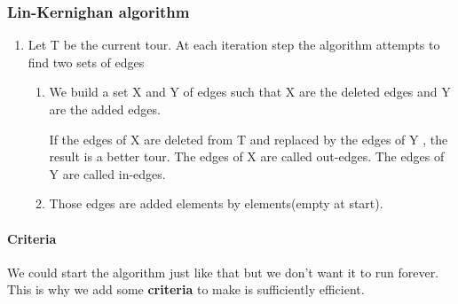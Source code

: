 \subsubsection{Lin-Kernighan algorithm}
\begin{enumerate}
    \item Let T be the current tour. At each iteration step the
        algorithm attempts to find two sets of edges

        \begin{enumerate}
            \item  We build a set X and Y of edges such that X are the
                deleted edges and Y are the added edges. 
                
                If the edges of X are deleted from T and replaced by the
                edges of Y , the result is a better tour. The edges of X
                are called out-edges. The edges of Y are called
                in-edges.
                
            \item Those edges are
                added elements by elements(empty at start).

        \end{enumerate}
\end{enumerate}

\paragraph{Criteria}

We could start the algorithm just like that but we don't want it to run
forever. This is why we add some \textbf{criteria} to make is sufficiently
efficient.

